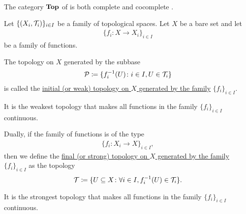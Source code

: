 \begin{theorem}
  The category $\operatorname{\mathbf{Top}}$ of is both complete  and cocomplete .
\end{theorem}

\begin{definition}\label{def:initial_topology}\cite{nLab:top}
  Let $\{ (X_i, \mathcal T_i) \}_{i \in I}$ be a family of topological spaces. Let $X$ be a bare set and let
  \begin{align*}
    \{ f_i: X \to X_i \}_{i \in I}
  \end{align*}
  be a family of functions.

  The topology on $X$ generated by the subbase
  \begin{align*}
    \mathcal P \coloneqq \{ f_i^{-1}(U) \colon i \in I, U \in \mathcal T_i \}
  \end{align*}
  is called the \uline{initial (or weak) topology on $X$ generated by the family} $\{ f_i \}_{i \in I}$.

  It is the weakest topology that makes all functions in the family $\{ f_i \}_{i \in I}$ continuous.
\end{definition}

\begin{definition}\label{def:final_topology}\cite{nLab:top}
  Dually, if the family of functions is of the type
  \begin{align*}
    \{ f_i: X_i \to X \}_{i \in I},
  \end{align*}
  then we define the \uline{final (or strong) topology on $X$ generated by the family} $\{ f_i \}_{i \in I}$ as the topology
  \begin{align*}
    \mathcal T \coloneqq \{ U \subseteq X \colon \forall i \in I, f_i^{-1}(U) \in \mathcal T_i \}.
  \end{align*}

  It is the strongest topology that makes all functions in the family $\{ f_i \}_{i \in I}$ continuous.
\end{definition}

